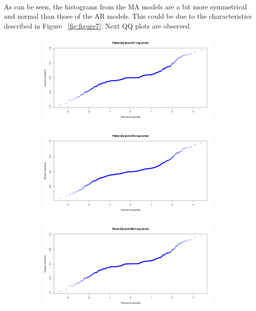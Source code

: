 \documentclass[12pt]{article}
\begin{document}
\paragraph{}
As can be seen, the histograms from the MA models are a bit more symmetrical and normal than those of the AR models. This could be due to the characteristics described in Figure ~\ref{fig:figure7}. Next QQ plots are observed.
\begin{figure}[H]
  \centering
  \begin{subfigure}[b]{0.6\linewidth}
    \includegraphics[width=\linewidth]{figure12-1.png}
  \end{subfigure}
  \begin{subfigure}[b]{0.6\linewidth}
    \includegraphics[width=\linewidth]{figure12-2.png}
  \end{subfigure}
  \begin{subfigure}[b]{0.6\linewidth}
    \includegraphics[width=\linewidth]{figure12-3.png}

\end{subfigure}
\end{figure}
\end{document}
